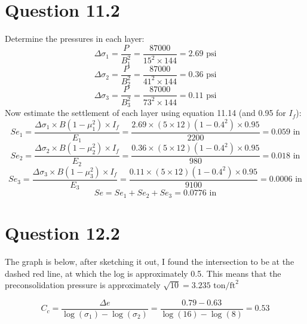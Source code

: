 \documentclass{article}
\begin{document}
\section*{Question 11.2}
Determine the pressures in each layer:
\[\Delta\sigma_1=\frac{P}{B_1^2}=\frac{87000}{15^2\times 144}=2.69\text{ psi}\] 
\[\Delta\sigma_2=\frac{P}{B_2^2}=\frac{87000}{41^2\times 144}=0.36\text{ psi}\]
\[\Delta\sigma_3=\frac{P}{B_3^2}=\frac{87000}{73^2\times 144}=0.11\text{ psi}\]  
Now estimate the settlement of each layer using equation 11.14 (and 0.95 for $I_f$): 
\[Se_1=\frac{\Delta\sigma_1\times B(1-\mu_1^2)\times I_f}{E_1}=\frac{2.69 \times (5\times 12)(1-0.4^2)\times 0.95}{2200}=0.059\text{ in}\] 
\[Se_2=\frac{\Delta\sigma_2\times B(1-\mu_2^2)\times I_f}{E_2}=\frac{0.36 \times (5\times 12)(1-0.4^2)\times 0.95}{980}=0.018\text{ in}\]
\[Se_3=\frac{\Delta\sigma_3\times B(1-\mu_3^2)\times I_f}{E_3}=\frac{0.11 \times (5\times 12)(1-0.4^2)\times 0.95}{9100}=0.0006\text{ in}\]  
\[Se=Se_1+Se_2+Se_3=\boxed{0.0776\text{ in}}\]
\section*{Question 12.2}
The graph is below, after sketching it out, I found the intersection to be at the dashed red line, at which the log is approximately 0.5. This means that the preconsolidation pressure is approximately $\sqrt{10}=\boxed{3.235\text{ ton/ft}^2}$
\begin{center}
\end{center}
\[C_c=\frac{\Delta e}{\log(\sigma_1)-\log(\sigma_2)}=\frac{0.79-0.63}{\log(16)-\log(8)}=\boxed{0.53}\]
\end{document}
